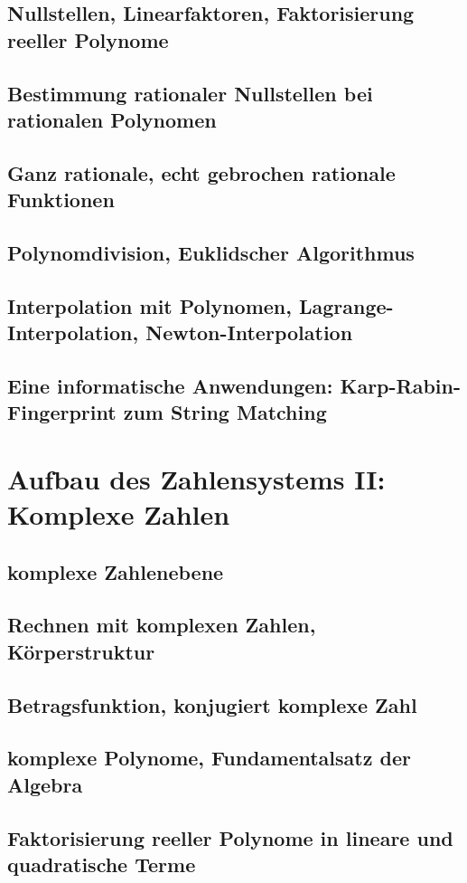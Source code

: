 \subsection{Nullstellen, Linearfaktoren, Faktorisierung reeller Polynome}
\subsection{Bestimmung rationaler Nullstellen bei rationalen Polynomen}
\subsection{Ganz rationale, echt gebrochen rationale Funktionen}
\subsection{Polynomdivision, Euklidscher Algorithmus}
\subsection{Interpolation mit Polynomen, Lagrange-Interpolation, Newton-Interpolation}
\subsection{Eine informatische Anwendungen: Karp-Rabin-Fingerprint zum String Matching}

\section{Aufbau des Zahlensystems II: Komplexe Zahlen}
\subsection{komplexe Zahlenebene}
\subsection{Rechnen mit komplexen Zahlen, Körperstruktur}
\subsection{Betragsfunktion, konjugiert komplexe Zahl}
\subsection{komplexe Polynome, Fundamentalsatz der Algebra}
\subsection{Faktorisierung reeller Polynome in lineare und quadratische Terme}
